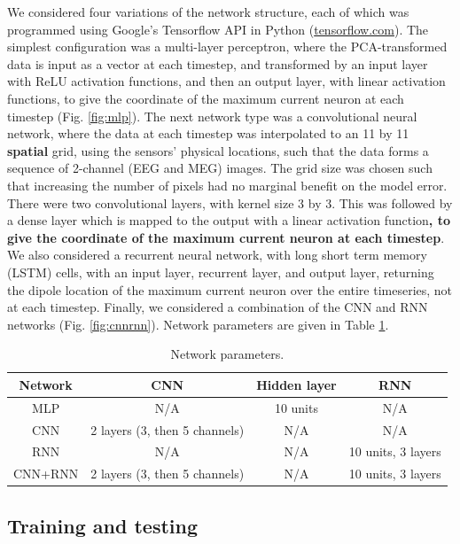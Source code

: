 \documentclass[journal,12pt,onecolumn,draftclsnofoot,]{IEEEtran}
\begin{document}
We considered four variations of the network structure, each of which was programmed using Google's Tensorflow API in Python (\url{tensorflow.com}). The simplest configuration was a multi-layer perceptron, where the PCA-transformed data is input as a vector at each timestep, and transformed by an input layer with ReLU activation functions, and then an output layer, with linear activation functions, to give the coordinate of the maximum current neuron at each timestep (Fig. \ref{fig:mlp}). The next network type was a convolutional neural network, where the data at each timestep was interpolated to an 11 by 11 \textbf{spatial} grid, using the sensors' physical locations, such that the data forms a sequence of 2-channel (EEG and MEG) images. The grid size was chosen such that increasing the number of pixels had no marginal benefit on the model error. There were two convolutional layers, with kernel size 3 by 3. This was followed by a dense layer which is mapped to the output with a linear activation function\textbf{, to give the coordinate of the maximum current neuron at each timestep}. We also considered a recurrent neural network, with long short term memory (LSTM) cells, with an input layer, recurrent layer, and output layer, returning the dipole location of the maximum current neuron over the entire timeseries, not at each timestep. Finally, we considered a combination of the CNN and RNN networks (Fig. \ref{fig:cnnrnn}). Network parameters are given in Table \ref{tab:params}. 

\begin{table}[h!]
  \centering
  \begin{tabular}{c||c|c|c}
    \hline
    Network & CNN & Hidden layer & RNN\\
    \hline
    \hline
    MLP & N/A & 10 units & N/A \\
    \hline
    CNN & 2 layers (3, then 5 channels) & N/A & N/A \\
    \hline
    RNN & N/A & N/A & 10 units, 3 layers \\
    \hline
    CNN+RNN & 2 layers (3, then 5 channels) &  N/A & 10 units, 3 layers \\
  \end{tabular}
  \caption{Network parameters.}
  \label{tab:params}
\end{table}


\subsection{Training and testing}
\end{document}
